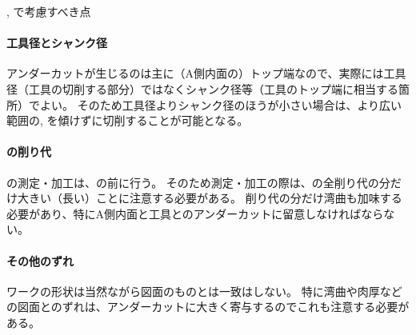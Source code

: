 \begin{Column}{\BfaceDimpleMilling, \DfaceDimpleMilling で考慮すべき点}
\paragraph*{工具径とシャンク径}
アンダーカットが生じるのは主に（A側内面の）トップ端なので、実際には工具径（工具の切削する部分）ではなくシャンク径等（工具のトップ端に相当する箇所）でよい。
そのため工具径よりシャンク径のほうが小さい場合は、より広い範囲の\BfaceDimpleMilling, \DfaceDimpleMilling を傾けずに切削することが可能となる。
\tcbline*
\paragraph*{\nameEndFacecut の削り代}
\Dimple の測定・加工は、\TopEndFacecutMilling の前に行う。
そのため測定・加工の際は、\nameEndFacecut の全削り代の分だけ大きい（長い）ことに注意する必要がある。
削り代の分だけ湾曲も加味する必要があり、特にA側内面と工具とのアンダーカットに留意しなければならない。
\tcbline*
\paragraph*{その他のずれ}
ワークの形状は当然ながら図面のものとは一致はしない。
特に湾曲や肉厚などの図面とのずれは、アンダーカットに大きく寄与するのでこれも注意する必要がある。
\end{Column}



